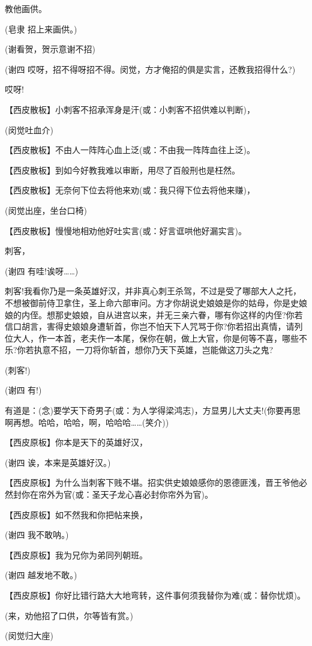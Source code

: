 教他画供。

(皂隶 招上来画供。)

(谢看贺，贺示意谢不招)

(谢四 哎呀，招不得呀招不得。闵觉，方才俺招的俱是实言，还教我招得什么?)

哎呀!

【西皮散板】小刺客不招承浑身是汗(或：小刺客不招供难以判断)，

(闵觉吐血介)

【西皮散板】不由人一阵阵心血上泛(或：不由我一阵阵血往上泛)。

【西皮散板】到如今好教我难以审断，用尽了百般刑也是枉然。

【西皮散板】无奈何下位去将他来劝(或：我只得下位去将他来赚)，

(闵觉出座，坐台口椅)

【西皮散板】慢慢地相劝他好吐实言(或：好言诓哄他好漏实言)。

刺客，

(谢四 有哇!诶呀\ldots{}\ldots{})

刺客!我看你乃是一条英雄好汉，并非真心刺王杀驾，不过是受了哪部大人之托，不想被御前侍卫拿住，圣上命六部审问。方才你胡说史娘娘是你的姑母，你是史娘娘的内侄。想那史娘娘，自从进宫以来，并无三亲六眷，哪有你这样的内侄?你若信口胡言，害得史娘娘身遭斩首，你岂不怕天下人咒骂于你?你若招出真情，请列位大人，作一本首，老夫作一本尾，保你在朝，做上大官，你是何等不喜，哪些不乐?你若执意不招，一刀将你斩首，想你乃天下英雄，岂能做这刀头之鬼?

(刺客!)

(谢四 有!)

有道是：(念)要学天下奇男子(或：为人学得梁鸿志)，方显男儿大丈夫!(你要再思啊再想。哈哈，哈哈，啊，哈哈哈\ldots{}\ldots{}(笑介))

【西皮原板】你本是天下的英雄好汉，

(谢四 诶，本来是英雄好汉。)

【西皮原板】为什么当刺客下贱不堪。招实供史娘娘感你的恩德匪浅，晋王爷他必然封你在帘外为官(或：圣天子龙心喜必封你帘外为官)。

【西皮原板】如不然我和你把帖来换，

(谢四 我不敢呐。)

【西皮原板】我为兄你为弟同列朝班。

(谢四 越发地不敢。)

【西皮原板】你好比错行路大大地弯转，这件事何须我替你为难(或：替你忧烦)。

(来，劝他招了口供，尔等皆有赏。)

(闵觉归大座)

